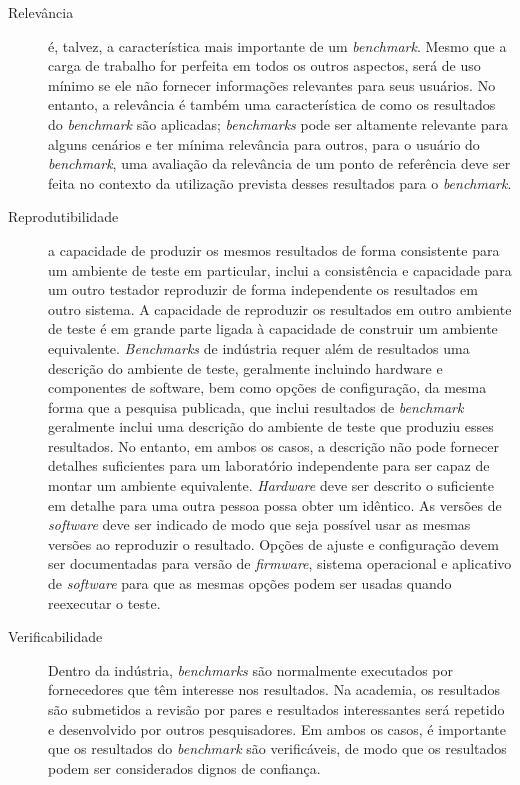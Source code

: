 \begin{description}
	\item[Relevância] é, talvez, a característica mais importante de um \textit{benchmark}. Mesmo que a carga de trabalho for perfeita em todos os outros aspectos, será de uso mínimo se ele não fornecer informações relevantes para seus usuários. No entanto, a relevância é também uma característica de como os resultados do \textit{benchmark} são aplicadas; \textit{benchmarks} pode ser altamente relevante para alguns cenários e ter mínima relevância para outros, para o usuário do \textit{benchmark}, uma avaliação da relevância de um ponto de referência deve ser feita no contexto da utilização prevista desses resultados para o \textit{benchmark}. \cite{Kistowski2015}
	
	\item[Reprodutibilidade] a capacidade de produzir os mesmos resultados de forma consistente para um ambiente de teste em particular, inclui a consistência e capacidade para um outro testador reproduzir de forma independente os resultados em outro sistema. A capacidade de reproduzir os resultados em outro ambiente de teste é em grande parte ligada à capacidade de construir um ambiente equivalente. \textit{Benchmarks} de indústria requer além de resultados uma descrição do ambiente de teste, geralmente incluindo hardware e componentes de software, bem como opções de configuração, da mesma forma que a pesquisa publicada, que inclui resultados de \textit{benchmark} geralmente inclui uma descrição do ambiente de teste que produziu esses resultados. No entanto, em ambos os casos, a descrição não pode fornecer detalhes suficientes para um laboratório independente para ser capaz de montar um ambiente equivalente. \textit{Hardware} deve ser descrito o suficiente em detalhe para uma outra pessoa possa obter um idêntico. As versões de \textit{software} deve ser indicado de modo que seja possível usar as mesmas versões ao reproduzir o resultado. Opções de ajuste e configuração devem ser documentadas para versão de \textit{firmware}, sistema operacional e aplicativo de \textit{software} para que as mesmas opções podem ser usadas quando reexecutar o teste. \cite{Kistowski2015}
	
	\item[Verificabilidade] Dentro da indústria, \textit{benchmarks} são normalmente executados por fornecedores que têm interesse nos resultados. Na academia, os resultados são submetidos a revisão por pares e resultados interessantes será repetido e desenvolvido por outros pesquisadores. Em ambos os casos, é importante que os resultados do \textit{benchmark} são verificáveis, de modo que os resultados podem ser considerados dignos de confiança. \cite{Kistowski2015}
	

\end{description}
